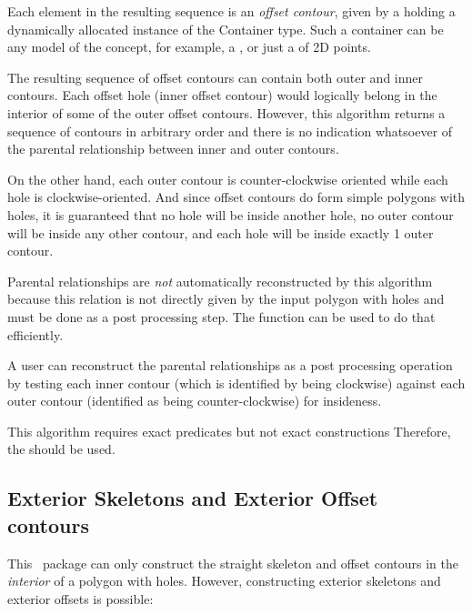 Each element in the resulting sequence is an {\em offset contour}, given by
a  holding a dynamically allocated instance 
of the Container type. Such a container can be any model of the 
 concept, for example, a , 
or just a  of 2D points.

The resulting sequence of offset contours can contain both outer and inner contours. 
Each offset hole (inner offset contour) would logically belong in the interior of some 
of the outer offset contours.
However, this algorithm returns a sequence of contours in arbitrary order and there is no
indication whatsoever of the parental relationship between inner and outer contours.

On the other hand, each outer contour is counter-clockwise oriented while each hole is clockwise-oriented.
And since offset contours do form simple polygons with holes, it is guaranteed that no hole will be inside another hole, no outer contour will be inside any other contour, and each hole will be inside exactly 1 outer contour.

Parental relationships are {\em not} automatically reconstructed by this algorithm because this relation is not directly given by the input polygon with holes and must be done as a post processing step. The function  can be used to do that efficiently.

A user can reconstruct the parental relationships as a post processing operation 
by testing each inner contour (which is identified by being clockwise) against each outer contour (identified as being counter-clockwise) for insideness.

This algorithm requires exact predicates but not exact constructions
Therefore, the  should be used.


\subsection{Exterior Skeletons and Exterior Offset contours}  

This \cgal\ package can only construct the straight skeleton and offset contours in the \textit{interior} of a polygon with holes. However, constructing exterior skeletons and exterior offsets is possible:

